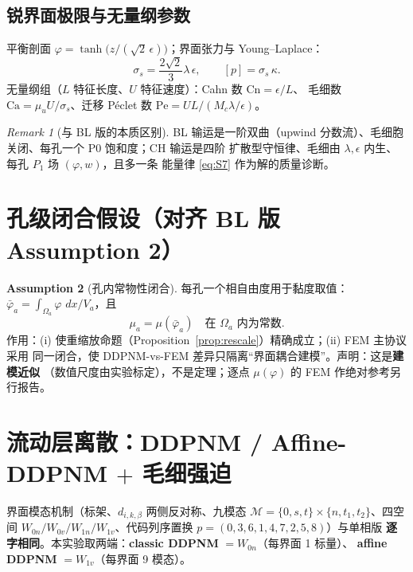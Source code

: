 \documentclass[11pt]{article}
\theoremstyle{definition}
\newtheorem{assumption}{Assumption}
\theoremstyle{plain}
\theoremstyle{remark}
\newtheorem{remarkx}[assumption]{Remark}
\newcommand{\dd}{\,dx}
\begin{document}
\subsection{锐界面极限与无量纲参数}
平衡剖面 $\varphi=\tanh\big(z/(\sqrt2\,\epsilon)\big)$；界面张力与 Young--Laplace：
\begin{equation}
\sigma_s=\frac{2\sqrt2}{3}\lambda\,\epsilon,
\qquad [p]=\sigma_s\,\kappa.
\tag{S8}\label{eq:S8}
\end{equation}
无量纲组（$L$ 特征长度、$U$ 特征速度）：Cahn 数 $\mathrm{Cn}=\epsilon/L$、
毛细数 $\mathrm{Ca}=\mu_uU/\sigma_s$、迁移 P\'eclet 数 $\mathrm{Pe}=UL/(M_c\lambda/\epsilon)$。

\begin{remarkx}[与 BL 版的本质区别]
BL 输运是一阶双曲（upwind 分数流）、毛细胞关闭、每孔一个 P0 饱和度；CH 输运是四阶
扩散型守恒律、毛细由 $\lambda,\epsilon$ 内生、每孔 $P_1$ 场 $(\varphi,w)$，且多一条
能量律 \eqref{eq:S7} 作为解的质量诊断。
\end{remarkx}

\section{孔级闭合假设（对齐 BL 版 Assumption 2）}

\begin{assumption}[孔内常物性闭合]\label{ass:S2}
每孔一个相自由度用于黏度取值：
$\bar\varphi_a=\int_{\Omega_a}\varphi\,\dd/V_a$，且
\begin{equation}
\mu_a=\mu(\bar\varphi_a)\quad\text{在 }\Omega_a\text{ 内为常数}.
\tag{S9}\label{eq:S9}
\end{equation}
作用：(i) 使重缩放命题（Proposition~\ref{prop:rescale}）精确成立；(ii) FEM 主协议采用
同一闭合，使 DDPNM-vs-FEM 差异只隔离``界面耦合建模''。声明：这是\textbf{建模近似}
（数值尺度由实验标定），不是定理；逐点 $\mu(\varphi)$ 的 FEM 作绝对参考另行报告。
\end{assumption}

\section{流动层离散：DDPNM / Affine-DDPNM $+$ 毛细强迫}

界面模态机制（标架、$d_{i,k,\beta}$ 两侧反对称、九模态
$\mathcal M=\{0,s,t\}\times\{n,t_1,t_2\}$、四空间
$W_{0n}/W_{0v}/W_{1n}/W_{1v}$、代码列序置换 $p=(0,3,6,1,4,7,2,5,8)$）与单相版
\textbf{逐字相同}。本实验取两端：\textbf{classic DDPNM} $=W_{0n}$（每界面 1 标量）、
\textbf{affine DDPNM} $=W_{1v}$（每界面 9 模态）。
\end{document}
